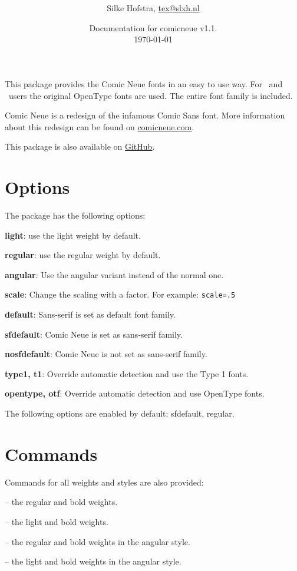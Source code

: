 \documentclass[10pt,a4paper,english,twocolumn]{article}
\title{%
	\vspace{-4em}
	\comicneuelight
	\resizebox{\linewidth}{!}{comicneue}\\
	\resizebox{\linewidth}{!}{Craig Rozynski's Comic Neue fonts for \LaTeX}
}
\author{Silke Hofstra, \href{mailto:tex@slxh.nl}{tex@slxh.nl}}
\date{Documentation for comicneue v1.1.\\ \today}
\begin{document}
\maketitle
This package provides the Comic Neue fonts in an easy to use way.
For \XeLaTeX\ and \LuaLaTeX\ users the original OpenType fonts are used.
The entire font family is included.

Comic Neue is a redesign of the infamous Comic Sans font.
More information about this redesign can be found on \href{http://comicneue.com/}{comicneue.com}.

This package is also available on \href{https://github.com/silkeh/latex-comicneue}{GitHub}.

\section{Options}
The package has the following options:
\begin{itemize*}
	\item \textbf{light}:          use the light weight by default.
	\item \textbf{regular}:        use the regular weight by default.
	\item \textbf{angular}:        Use the angular variant instead of the normal one.
	\item \textbf{scale}:          Change the scaling with a factor. For example:  \texttt{scale=.5}
	\item \textbf{default}:        Sans-serif is set as default font family.
	\item \textbf{sfdefault}:      Comic Neue is set as sans-serif family.
	\item \textbf{nosfdefault}:    Comic Neue is not set as sans-serif family.
	\item \textbf{type1, t1}:      Override automatic detection and use the Type 1 fonts.
	\item \textbf{opentype, otf}:  Override automatic detection and use OpenType fonts.
\end{itemize*}
The following options are enabled by default: sfdefault, regular.

\section{Commands}
Commands for all weights and styles are also provided:
\begin{itemize*}
	\item {}
		-- the regular and bold weights.
	\item {}
		-- the light and bold weights.
	\item {}
		-- the regular and bold weights in the angular style.
	\item {}
		-- the light and bold weights in the angular style.
\end{itemize*}
\end{document}
